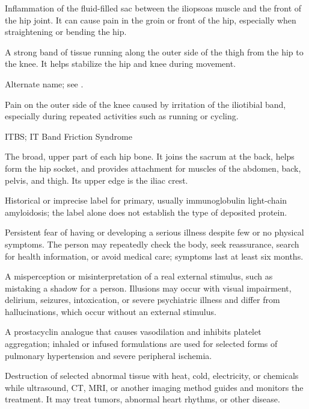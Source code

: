  Inflammation of the fluid-filled sac between the iliopsoas muscle and the front of the hip joint. It can cause pain in the groin or front of the hip, especially when straightening or bending the hip.

 A strong band of tissue running along the outer side of the thigh from the hip to the knee. It helps stabilize the hip and knee during movement.

 Alternate name; see .

 Pain on the outer side of the knee caused by irritation of the iliotibial band, especially during repeated activities such as running or cycling.

\synonyms
ITBS; IT Band Friction Syndrome

 The broad, upper part of each hip bone. It joins the sacrum at the back, helps form the hip socket, and provides attachment for muscles of the abdomen, back, pelvis, and thigh. Its upper edge is the iliac crest.

 Historical or imprecise label for primary, usually immunoglobulin light-chain amyloidosis; the label alone does not establish the type of deposited protein.

 Persistent fear of having or developing a serious illness despite few or no physical symptoms. The person may repeatedly check the body, seek reassurance, search for health information, or avoid medical care; symptoms last at least six months.

 A misperception or misinterpretation of a real external stimulus, such as mistaking a shadow for a person. Illusions may occur with visual impairment, delirium, seizures, intoxication, or severe psychiatric illness and differ from hallucinations, which occur without an external stimulus.

 A prostacyclin analogue that causes vasodilation and inhibits platelet aggregation; inhaled or infused formulations are used for selected forms of pulmonary hypertension and severe peripheral ischemia.

 Destruction of selected abnormal tissue with heat, cold, electricity, or chemicals while ultrasound, CT, MRI, or another imaging method guides and monitors the treatment. It may treat tumors, abnormal heart rhythms, or other disease.

